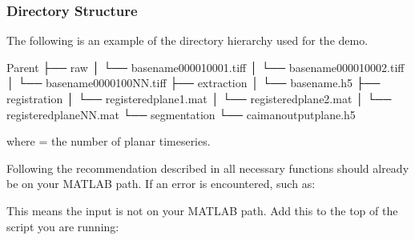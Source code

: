 \documentclass[letterpaper,10pt,english]{sphinxmanual}
\begin{document}
\subsubsection{Directory Structure}
\label{\detokenize{get_started/getting_started:directory-structure}}
\sphinxAtStartPar
The following is an example of the directory hierarchy
used for the demo.

\begin{sphinxVerbatim}[commandchars=\\\{\}]
Parent
├── raw
│   └── basename\PYGZus{}00001\PYGZus{}0001.tiff
│   └── basename\PYGZus{}00001\PYGZus{}0002.tiff
│   └── basename\PYGZus{}00001\PYGZus{}00NN.tiff
├── extraction
│   └── basename.h5
├── registration
│   └── registered\PYGZus{}plane\PYGZus{}1.mat
│   └── registered\PYGZus{}plane\PYGZus{}2.mat
│   └── registered\PYGZus{}plane\PYGZus{}NN.mat
└── segmentation
    └── caiman\PYGZus{}output\PYGZus{}plane\PYGZus{}.h5
\end{sphinxVerbatim}

\sphinxAtStartPar
where  = the number of \sphinxtitleref{{[}X, Y, T{]}} planar time\sphinxhyphen{}series.

\sphinxAtStartPar
Following the recommendation described in {\hyperref[\detokenize{get_started/install:install-recommendation}]{}} all necessary functions should already be on your
MATLAB path. If an error is encountered, such as:

\begin{sphinxVerbatim}[commandchars=\\\{\}]
\end{sphinxVerbatim}

\sphinxAtStartPar
This means the input is not on your MATLAB path. Add this to the top of the script you are running:
\begin{quote}

\begin{sphinxVerbatim}[commandchars=\\\{\}]
\PYG{p}{[}\PYG{p}{]}
\end{sphinxVerbatim}
\end{quote}
\end{document}
